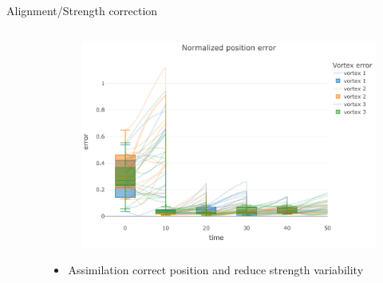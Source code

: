 \documentclass[aspectratio=169]{beamer} %
\begin{document}
\begin{frame}{Alignment/Strength correction}
    \vspace{-0.5cm}
    \begin{columns}
        \begin{column}{0.5\textwidth}
            \begin{figure}
                \centering
            \end{figure}

        \end{column}
        \begin{column}{0.5\textwidth}

            \begin{figure}
                \centering
                \includegraphics[width=\textwidth]{images/align_part_error.pdf}
            \end{figure}

            \begin{itemize}
                \item Assimilation correct position and reduce strength variability
            \end{itemize}
        \end{column}
    \end{columns}
\end{frame}

\end{document}
